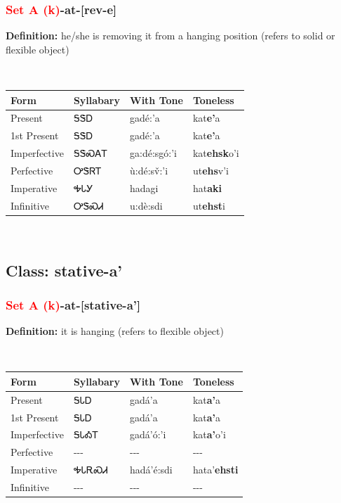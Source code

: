 \subsubsection*{\textcolor{Red}{Set A (k)}{-}\textbf{at}{-}[rev-e]}
\nopagebreak
\textbf{Definition: } he/she is removing it from a hanging position (refers to solid or flexible object)
\\[0.5em]
\begin{tabularx}{\textwidth}{l X X X}%
\toprule%
\textbf{Form}&\textbf{Syllabary}&\textbf{With Tone}&\textbf{Toneless}\\%
\midrule%
Present&ᎦᏕᎠ&gadé:’a&kat\textbf{e'}a\\%
1st Present&ᎦᏕᎠ&gadé:’a&kat\textbf{e'}a\\%
Imperfective&ᎦᏕᏍᎪᎢ&ga:dé:sgó:’i&kat\textbf{ehsk}o'i\\%
Perfective&ᎤᏕᏒᎢ&ù:dé:sv̌:’i&ut\textbf{ehs}v'i\\%
Imperative&ᎭᏓᎩ&hadagi&hat\textbf{aki}\\%
Infinitive&ᎤᏕᏍᏗ&u:dè:sdi&ut\textbf{ehst}i\\%
\bottomrule%
\end{tabularx}
\\[1em]
\needspace{3in}
\subsection*{Class: stative-a'}
\nopagebreak
\needspace{2in}
\subsubsection*{\textcolor{Red}{Set A (k)}{-}\textbf{at}{-}[stative-a']}
\nopagebreak
\textbf{Definition: } it is hanging (refers to flexible object)
\\[0.5em]
\begin{tabularx}{\textwidth}{l X X X}%
\toprule%
\textbf{Form}&\textbf{Syllabary}&\textbf{With Tone}&\textbf{Toneless}\\%
\midrule%
Present&ᎦᏓᎠ&gadá’a&kat\textbf{a'}a\\%
1st Present&ᎦᏓᎠ&gadá’a&kat\textbf{a'}a\\%
Imperfective&ᎦᏓᎣᎢ&gadá’ó:’i&kat\textbf{a'}o'i\\%
Perfective&{-}{-}{-}&{-}{-}{-}&{-}{-}{-}\\%
Imperative&ᎭᏓᎡᏍᏗ&hadá’é:sdi&hata'\textbf{ehsti}\\%
Infinitive&{-}{-}{-}&{-}{-}{-}&{-}{-}{-}\\%
\bottomrule%
\end{tabularx}
\\[1em]
\needspace{3in}
